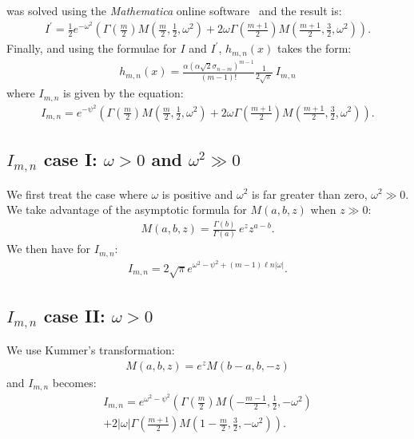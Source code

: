 \documentclass[preprint,12pt]{elsarticle}
\begin{document}
was solved using the \emph{Mathematica} online software~\cite{math} and the result is:
\begin{align}
I^\prime = \frac{1}{2} e^{-\omega^2} 
\left(  \Gamma\left( \frac{m}{2} \right) M\left( \frac{m}{2}, \frac{1}{2}, \omega^2 \right)  + 2\omega \Gamma\left( \frac{m+1}{2} \right) M\left(\frac{m+1}{2}, \frac{3}{2}, \omega^2  \right)  \right).  
\end{align}
Finally, and using the formulae for $I$ and $I^\prime$, $h_{m,n}(x)$ takes the form:
\begin{align}
h_{m,n}(x) =  \frac{ \alpha (\alpha\sqrt{2} \sigma_{n-m})^{m-1}}{(m-1)!} \frac{1}{2\sqrt{\pi}} \  I_{m,n}
\end{align} 
where $I_{m,n}$  is given by the equation:
\begin{align}
I_{m,n} = e^{-\psi^2} \left( \Gamma\left( \frac{m}{2} \right) M\left( \frac{m}{2}, \frac{1}{2}, \omega^2 \right)  + 2\omega \Gamma\left( \frac{m+1}{2} \right) M\left(\frac{m+1}{2}, \frac{3}{2}, \omega^2 \right) \right).  
\end{align}

\subsection*{$I_{m,n}$ case I: $\omega> 0$ and $\omega^2 \gg 0$ }
%

We first treat the case where $\omega$ is positive and $\omega^2$ is far greater than zero, $\omega^2 \gg 0$.  
We take advantage of the asymptotic formula for $M(a,b,z)$ when $z \gg 0$:
\begin{align}
M(a,b,z) = \frac{\Gamma (b)}{\Gamma(a)} \  e^z z^{a-b}.
\end{align}
We then have for $I_{m,n}$:
\begin{align}
 I_{m,n} = 2\sqrt{\pi}   e^{\omega^2 - \psi^2 + (m-1) \ell n |\omega|}.
\end{align}

\subsection*{$I_{m,n}$ case II: $\omega >0$}
%

We use Kummer's transformation:
\begin{align}
M(a,b,z) = e^z M(b-a,b,-z)
\end{align}
and $I_{m,n}$ becomes:
\begin{align}
I_{m,n} = e^{\omega^2 -\psi^2 } \left(  \Gamma\left( \frac{m}{2} \right) M\left(-\frac{m-1}{2}, \frac{1}{2}, -\omega^2 \right)  \nonumber \right. \\ \left. + 2|\omega| \Gamma\left( \frac{m+1}{2} \right) M\left(1-\frac{m}{2}, \frac{3}{2}, -\omega^2 \right)     \right).
\end{align}
\end{document}

